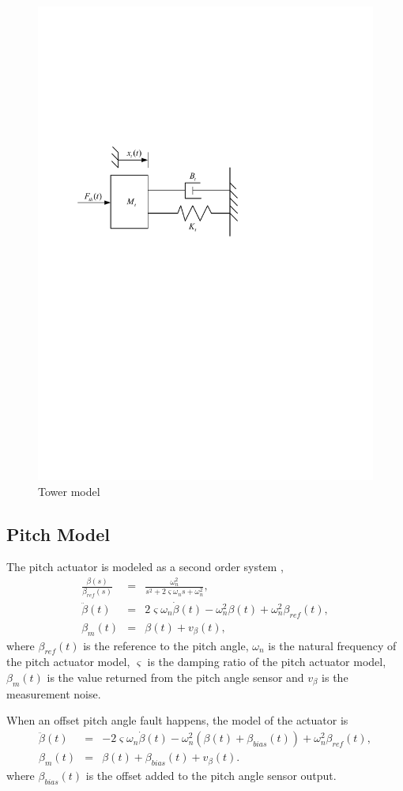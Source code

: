 \documentclass{article}
\begin{document}
\begin{figure}[!thb]
  \centering
  \includegraphics[width=0.55\hsize]{Visio-damping.pdf}
  \caption{Tower model}
  \label{fig:damping}
\end{figure}

\subsection{Pitch Model}

The pitch actuator is modeled as a second order system \cite{ref:15},
\begin{eqnarray}
  \frac{\beta(s)}{\beta_{ref}(s)} &=& \frac{\omega_n^2}{s^2+2\varsigma\omega_n{}s + \omega_n^2}, \\
  \ddot{\beta}(t) &=& 2\varsigma\omega_n\dot{\beta}(t) - \omega_n^2\beta(t) + \omega_n^2\beta_{ref}(t), \\
  \beta_m(t) &=& \beta(t) + v_\beta(t),
\end{eqnarray}
where $\beta_{ref}(t)$  is the reference to the pitch angle,
$\omega_n$ is the natural frequency of the pitch actuator model,
$\varsigma$ is the damping ratio of the pitch actuator model,
$\beta_m(t)$ is the value returned from the pitch angle sensor
and  $v_\beta$ is the measurement noise.

When an offset pitch angle fault happens, the model of the
actuator is
\begin{eqnarray}
  \ddot{\beta}(t) &=& -2\varsigma\omega_n\dot{\beta}(t) - \omega_n^2(\beta(t)+\beta_{bias}(t))+\omega^2_n\beta_{ref}(t), \\
  \beta_m(t) &=& \beta(t) + \beta_{bias}(t) + v_\beta(t).
\end{eqnarray}
where $\beta_{bias}(t)$ is the offset added to the pitch angle sensor output.
\end{document}
